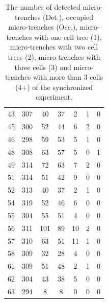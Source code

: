 \documentclass[pdftex,12pt,a4paper]{report}
\begin{document}
\begin{appendices}
\begin{table}[H]
\begin{tabular}[t]{ c | c | c | c | c | c | c }
\\
43 & 307 & 40 & 37 & 2 & 1 & 0
\\
45 & 300 & 52 & 44 & 6 & 2 & 0
\\
46 & 298 & 59 & 53 & 5 & 1 & 0
\\
48 & 308 & 63 & 57 & 5 & 0 & 1
\\
49 & 314 & 72 & 63 & 7 & 2 & 0
\\
51 & 314 & 51 & 42 & 9 & 0 & 0
\\
52 & 313 & 40 & 37 & 2 & 1 & 0
\\
54 & 319 & 52 & 46 & 6 & 0 & 0
\\
55 & 304 & 55 & 51 & 4 & 0 & 0
\\
56 & 311 & 101 & 89 & 10 & 2 & 0
\\
57 & 310 & 63 & 51 & 11 & 1 & 0
\\
58 & 309 & 32 & 28 & 4 & 0 & 0
\\
61 & 309 & 51 & 48 & 2 & 1 & 0
\\
62 & 304 & 43 & 38 & 5 & 0 & 0
\\
63 & 294 & 8 & 8 & 0 & 0 & 0
\end{tabular}
\caption[The occupancy statistics of the synchronized experiment]{The number of detected micro-trenches (Det.), occupied micro-trenches (Occ.), micro-trenches with one cell tree (1), micro-trenches with two cell trees (2), micro-trenches with three cells (3) and micro-trenches with more than 3 cells (4+) of the synchronized experiment.}
\end{table}
\label{table:occupancy_statistics_syn}






\end{appendices}
\end{document}
